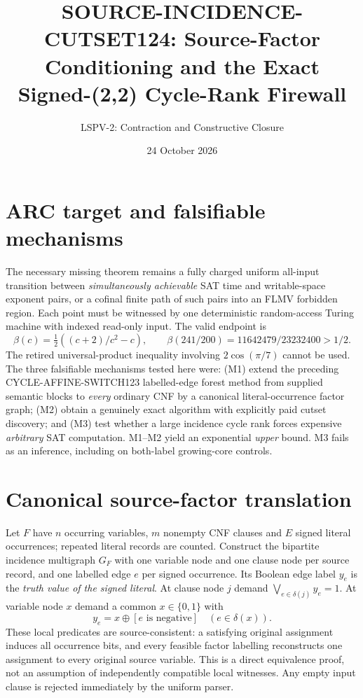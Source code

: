 \documentclass[11pt]{article}
\title{SOURCE-INCIDENCE-CUTSET124: Source-Factor Conditioning and the Exact Signed-(2,2) Cycle-Rank Firewall}
\author{LSPV-2: Contraction and Constructive Closure}
\date{24 October 2026}
\begin{document}
\maketitle
\begin{center}\end{center}

\section{ARC target and falsifiable mechanisms}
The necessary missing theorem remains a fully charged uniform all-input transition between \emph{simultaneously achievable} SAT time and writable-space exponent pairs, or a cofinal finite path of such pairs into an FLMV forbidden region. Each point must be witnessed by one deterministic random-access Turing machine with indexed read-only input. The valid endpoint is
\[
 \beta(c)=\tfrac12((c+2)/c^2-c),\qquad
 \beta(241/200)=11642479/23232400>1/2.
\]
The retired universal-product inequality involving $2\cos(\pi/7)$ cannot be used. The three falsifiable mechanisms tested here were: (M1) extend the preceding CYCLE-AFFINE-SWITCH123 labelled-edge forest method from supplied semantic blocks to \emph{every} ordinary CNF by a canonical literal-occurrence factor graph; (M2) obtain a genuinely exact algorithm with explicitly paid cutset discovery; and (M3) test whether a large incidence cycle rank forces expensive \emph{arbitrary} SAT computation. M1--M2 yield an exponential \emph{upper} bound. M3 fails as an inference, including on both-label growing-core controls.

\section{Canonical source-factor translation}
Let $F$ have $n$ occurring variables, $m$ nonempty CNF clauses and $E$ signed literal occurrences; repeated literal records are counted. Construct the bipartite incidence multigraph $G_F$ with one variable node and one clause node per source record, and one labelled edge $e$ per signed occurrence. Its Boolean edge label $y_e$ is the \emph{truth value of the signed literal}. At clause node $j$ demand $\bigvee_{e\in\delta(j)}y_e=1$. At variable node $x$ demand a common $x\in\{0,1\}$ with
\[
y_e=x\oplus[e\text{ is negative}]\quad(e\in\delta(x)).
\]
These local predicates are source-consistent: a satisfying original assignment induces all occurrence bits, and every feasible factor labelling reconstructs one assignment to every original source variable. This is a direct equivalence proof, not an assumption of independently compatible local witnesses. Any empty input clause is rejected immediately by the uniform parser.
\end{document}
